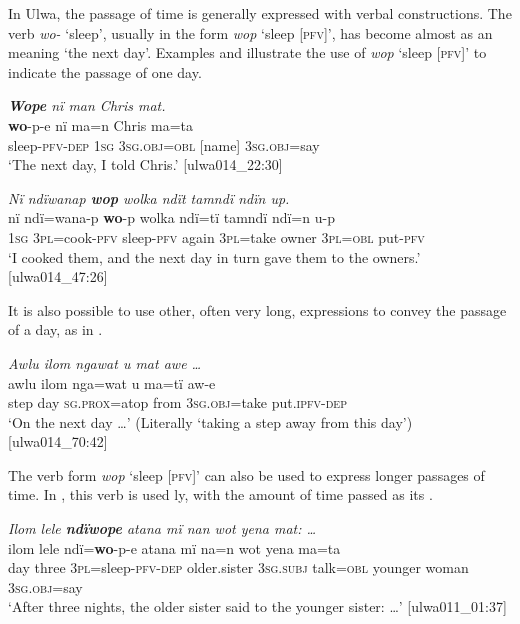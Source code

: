 In Ulwa, the passage of time is generally expressed with verbal constructions. The verb \textit{wo-} ‘sleep’, usually in the  form \textit{wop} ‘sleep [\textsc{pfv}]’, has become almost  as an  meaning ‘the next day’. Examples  and  illustrate the use of \textit{wop} ‘sleep [\textsc{pfv]’} to indicate the passage of one day.

\ea%
    \label{ex:sem:29}
          \textit{\textbf{Wope} nï man Chris mat.}\\
\gll    \textbf{wo}{}-p-e      nï    ma=n      Chris  ma=ta\\
    sleep-\textsc{pfv-dep}  \textsc{1sg}  \textsc{3sg.obj=obl}  [name]  3\textsc{sg.obj}=say\\
\glt `The next day, I told Chris.’ [ulwa014\_22:30]
\z

\ea%
    \label{ex:sem:30}
          \textit{Nï ndïwanap \textbf{wop} wolka ndït tamndï ndïn up.}\\
\gll    nï    ndï=wana-p  \textbf{wo}{}-p    wolka  ndï=tï    tamndï     ndï=n    u-p\\
    1\textsc{sg}  \textsc{3pl=}cook-\textsc{pfv}  sleep-\textsc{pfv}  again  \textsc{3pl}=take  owner    3\textsc{pl=obl}  put-\textsc{pfv}\\
\glt `I cooked them, and the next day in turn gave them to the owners.’ [ulwa014\_47:26]
\z

\newpage

It is also possible to use other, often very long, expressions to convey the passage of a day, as in .

\ea%
    \label{ex:sem:31}
          \textit{Awlu ilom ngawat u mat awe …}\\
\gll    awlu  ilom  nga=wat    u    ma=tï      aw-e\\
    step  day    \textsc{sg.prox}=atop  from  \textsc{3sg.obj}=take  put.\textsc{ipfv-dep}\\
\glt `On the next day …’ (Literally ‘taking a step away from this day’) [ulwa014\_70:42]
\z

The verb form \textit{wop} ‘sleep [\textsc{pfv]’} can also be used to express longer passages of time. In , this verb is used ly, with the amount of time passed as its .

\ea%
    \label{ex:sem:32}
          \textit{Ilom lele \textbf{ndïwope} atana mï nan wot yena mat: …}\\
\gll    ilom  lele    ndï=\textbf{wo}{}-p-e      atana    mï na=n    wot    yena  ma=ta\\
    day    three  3\textsc{pl}=sleep-\textsc{pfv-dep}  older.sister  3\textsc{sg.subj}    talk=\textsc{obl}  younger  woman    3\textsc{sg.obj}=say\\
\glt `After three nights, the older sister said to the younger sister: …’ [ulwa011\_01:37]
\z

